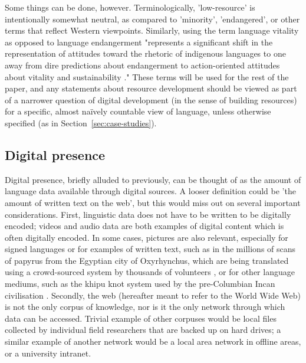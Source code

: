 Some things can be done, however. Terminologically, 'low-resource' is intentionally somewhat neutral, as compared to 'minority', 'endangered', or other terms that reflect Western viewpoints. Similarly, using the term language vitality as opposed to language endangerment "represents a significant shift in the representation of attitudes toward the rhetoric of indigenous languages to one away from dire predictions about endangerment to action-oriented attitudes about vitality and sustainability \citep{grenoble2016response}." These terms will be used for the rest of the paper, and any statements about resource development should be viewed as part of a narrower question of digital development (in the sense of building resources) for a specific, almost na\"ively countable view of language, unless otherwise specified (as in Section~\ref{sec:case-studies}).




\subsection{Digital presence}


Digital presence, briefly alluded to previously, can be thought of as the amount of language data available through digital sources. A looser definition could be 'the amount of written text on the web', but this would miss out on several important considerations. First, linguistic data does not have to be written to be digitally encoded; videos and audio data are both examples of digital content which is often digitally encoded. In some cases, pictures are also relevant, especially for signed languages or for examples of written text, such as in the millions of scans of papyrus from the Egyptian city of Oxyrhynchus, which are being translated using a crowd-sourced system by thousands of volunteers \citep{williams2014computational}, or for other language mediums, such as the khipu knot system used by the pre-Columbian Incan civilisation \citep{quilter2002narrative}. Secondly, the web (hereafter meant to refer to the World Wide Web) is not the only corpus of knowledge, nor is it the only network through which data can be accessed. Trivial example of other corpuses would be local files collected by individual field researchers that are backed up on hard drives; a similar example of another network would be a local area network in offline areas, or a university intranet.

